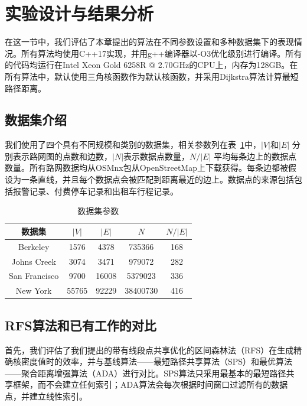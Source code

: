 \section{实验设计与结果分析}
\label{sec8:exp}

在这一节中，我们评估了本章提出的算法在不同参数设置和多种数据集下的表现情况。所有算法均使用C++17实现，并用g++编译器以-O3优化级别进行编译。所有的代码均运行在Intel Xeon Gold 6258R @ 2.70GHz的CPU上，内存为128GB。在所有算法中，默认使用三角核函数作为默认核函数，并采用Dijkstra算法计算最短路径距离。

\subsection{数据集介绍}

我们使用了四个具有不同规模和类别的数据集，相关参数列在表~\ref{tab:datasets}中，$\vert V \vert$和$\vert E \vert$ 分别表示路网图的点数和边数，$\vert N \vert$表示数据点数量，$N / \vert E \vert$ 平均每条边上的数据点数量。所有路网数据均从OSMnx包从OpenStreetMap上下载获得。每条边都被假设为一条直线，并且每个数据点会被匹配到距离最近的边上。数据点的来源包括包括报警记录、付费停车记录和出租车行程记录。

\begin{table}[h]
\centering
\def\arraystretch{1.5}
\caption{数据集参数}
\label{tab:datasets}
\begin{tabular}{c|c|c|c|c} 
\hline
数据集     & $\vert V \vert$ & $\vert E \vert$ & $N$ & $N / \vert E \vert$  \\ 
\hline \hline
Berkeley    & 1576            & 4378            & 735366          & 168                              \\ 
\hline
Johns Creek & 3074            & 3471            & 979072          & 282                              \\ 
\hline
San Francisco  & 9700         & 16008           & 5379023         & 336                              \\ 
\hline
New York	& 55765           & 92229           & 38400730        & 416                              \\ 
\hline
\end{tabular}
\end{table}

\subsection{RFS算法和已有工作的对比}

首先，我们评估了我们提出的带有线段点共享优化的区间森林法（RFS）在生成精确核密度值时的效率，并与基线算法——最短路径共享算法（SPS）和最优算法——聚合距离增强算法（ADA）进行对比。SPS算法只采用最基本的最短路径共享框架，而不会建立任何索引；ADA算法会每次根据时间窗口过滤所有的数据点，并建立线性索引。

